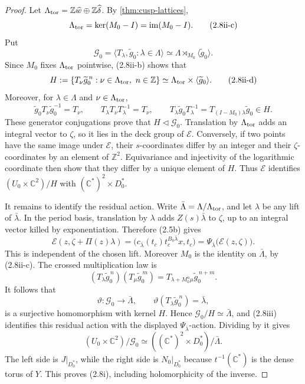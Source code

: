 \begin{proof}
Let
\(\Lambda_{\rm tor}=\mathbb Z\widehat w\oplus
\mathbb Z\widehat\delta\).  By \cref{thm:cusp-lattices},
\[
 \Lambda_{\rm tor}=\ker(M_0-I)=\operatorname{im}(M_0-I).
\tag{2.8ii-c}
\]
Put
\[
 \mathcal G_0=\langle T_\lambda,\widetilde g_0:\lambda\in\Lambda\rangle
 \simeq\Lambda\rtimes_{M_0}\langle\widetilde g_0\rangle.
\]
Since \(M_0\) fixes \(\Lambda_{\rm tor}\) pointwise, (2.8ii-b) shows that
\[
 H:=\{T_\nu\widetilde g_0^{\,n}:
          \nu\in\Lambda_{\rm tor},\ n\in\mathbb Z\}
 \simeq\Lambda_{\rm tor}\times\langle\widetilde g_0\rangle.
\tag{2.8ii-d}
\]
Moreover, for \(\lambda\in\Lambda\) and
\(\nu\in\Lambda_{\rm tor}\),
\[
 \widetilde g_0T_\nu\widetilde g_0^{-1}=T_\nu,
 \qquad
 T_\lambda T_\nu T_\lambda^{-1}=T_\nu,
 \qquad
 T_\lambda\widetilde g_0T_\lambda^{-1}
 =T_{(I-M_0)\lambda}\widetilde g_0\in H.
\tag{2.8ii-e}
\]
These generator conjugations prove that \(H\triangleleft\mathcal G_0\).
Translation by \(\Lambda_{\rm tor}\) adds an integral vector to \(\zeta\),
so it lies in the deck group of \(\mathcal E\).
Conversely, if two points have the same image under \(\mathcal E\), their
\(s\)-coordinates differ by an integer and their \(\zeta\)-coordinates by
an element of \(\mathbb Z^2\).  Equivariance and injectivity of the
logarithmic coordinate then show that they differ by a unique element of \(H\).
Thus \(\mathcal E\) identifies
\((U_0\times\mathbb C^2)/H\) with
\((\mathbb C^*)^2\times D_0^*\).

It remains to identify the residual action.  Write
\(\bar\Lambda=\Lambda/\Lambda_{\rm tor}\), and let \(\lambda\) be any lift
of \(\bar\lambda\).  In the period basis, translation by \(\lambda\) adds
\(Z(s)\bar\lambda\) to \(\zeta\), up to an integral vector killed by
exponentiation.  Therefore (2.5b) gives
\[
 \mathcal E(z,\zeta+\Pi(z)\lambda)
 =\bigl(c_{\bar\lambda}(t_c)t_c^{B_0\bar\lambda}x,t_c\bigr)
 =\Psi_{\bar\lambda}\bigl(\mathcal E(z,\zeta)\bigr).
\tag{2.8iii}
\]
This is independent of the chosen lift.  Moreover \(M_0\) is the identity
on \(\bar\Lambda\), by (2.8ii-c).  The crossed multiplication law is
\[
 (T_\lambda\widetilde g_0^{\,n})
 (T_\mu\widetilde g_0^{\,m})
 =T_{\lambda+M_0^n\mu}\widetilde g_0^{\,n+m}.
\]
It follows that
\[
 \vartheta:\mathcal G_0\longrightarrow\bar\Lambda,
 \qquad
 \vartheta(T_\lambda\widetilde g_0^{\,n})=\bar\lambda,
\]
is a surjective homomorphism with kernel \(H\).  Hence
\(\mathcal G_0/H\simeq\bar\Lambda\), and (2.8iii) identifies this residual
action with the displayed \(\Psi_{\bar\lambda}\)-action.  Dividing by it
gives
\[
 (U_0\times\mathbb C^2)/\mathcal G_0
 \simeq
 ((\mathbb C^*)^2\times D_0^*)/\bar\Lambda.
\]
The left side is \(J|_{D_0^*}\), while the right side is
\(N_0|_{D_0^*}\) because \(t^{-1}(\mathbb C^*)\) is the dense torus of
\(Y\).  This proves (2.8i), including holomorphicity of the inverse.
\end{proof}


